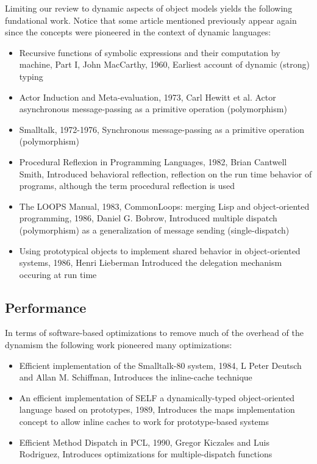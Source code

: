 Limiting our review to dynamic aspects of object models yields the following
fundational work.  Notice that some article mentioned previously appear again
since the concepts were pioneered in the context of dynamic languages:
\begin{itemize}
    \item Recursive functions of symbolic expressions and their computation by
        machine, Part I, John MacCarthy, 1960, Earliest account of dynamic (strong) typing 
    \item Actor Induction and Meta-evaluation, 1973, Carl Hewitt et al. Actor
        asynchronous message-passing as a primitive operation (polymorphism)
    \item Smalltalk, 1972-1976, Synchronous message-passing as a primitive
        operation (polymorphism)
    \item Procedural Reflexion in Programming Languages, 1982, Brian Cantwell
        Smith, Introduced behavioral reflection, reflection on the run time behavior of programs, although the term procedural reflection is used
    \item The LOOPS Manual, 1983, CommonLoops: merging Lisp and object-oriented
        programming, 1986, Daniel G. Bobrow, Introduced multiple dispatch (polymorphism) as a generalization of message sending (single-dispatch)
    \item Using prototypical objects to implement shared behavior in
        object-oriented systems, 1986, Henri Lieberman Introduced the delegation mechanism
        occuring at run time
\end{itemize}

\subsection{Performance}
In terms of software-based optimizations to remove much of the overhead of the dynamism the following work pioneered many optimizations:
\begin{itemize}
    \item Efficient implementation of the Smalltalk-80 system, 1984, L Peter
        Deutsch and Allan M. Schiffman, Introduces the inline-cache technique
    \item An efficient implementation of SELF a dynamically-typed
        object-oriented language based on prototypes, 1989, Introduces the maps
        implementation concept to allow inline caches to work for
        prototype-based systems 
    \item Efficient Method Dispatch in PCL, 1990, Gregor Kiczales and Luis
        Rodriguez, Introduces optimizations for multiple-dispatch functions
\end{itemize}



